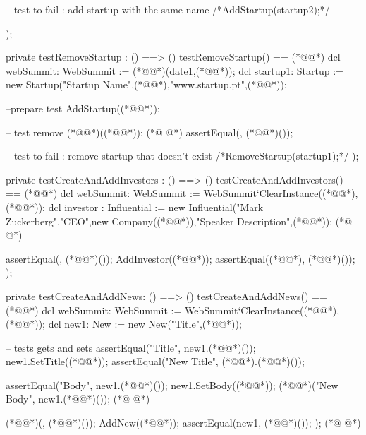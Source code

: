 \begin{vdmpp}[breaklines=true]
  -- test to fail : add startup with the same name
  /*AddStartup(startup2);*/
  
 );
 
 private testRemoveStartup : () ==> ()
 testRemoveStartup() == (*@\vdmnotcovered{(}@*)
  dcl webSummit: WebSummit := (*@@*)(date1,(*@@*));
  dcl startup1: Startup := new Startup("Startup Name",(*@@*),"www.startup.pt",(*@@*));
  
  --prepare test
  AddStartup((*@@*));
  
  -- test remove
  (*@@*)((*@@*));
(*@
\label{testCreateAndAddInvestors:419}
@*)
  assertEqual({}, (*@@*)());
  
  -- test to fail : remove startup that doesn't exist
  /*RemoveStartup(startup1);*/
 );
 
 private testCreateAndAddInvestors : () ==> ()
 testCreateAndAddInvestors() == (*@\vdmnotcovered{(}@*)
  dcl webSummit: WebSummit := WebSummit`ClearInstance((*@@*),(*@@*));
  dcl investor : Influential := new Influential("Mark Zuckerberg","CEO",new Company((*@@*)),"Speaker Description",(*@@*));
(*@
\label{testCreateAndAddNews:429}
@*)

  assertEqual({}, (*@@*)());
  AddInvestor((*@@*));
  assertEqual({(*@@*)}, (*@@*)());
 );
 
 private testCreateAndAddNews: () ==> ()
 testCreateAndAddNews() == (*@\vdmnotcovered{(}@*)
  dcl webSummit: WebSummit := WebSummit`ClearInstance((*@@*),(*@@*));
  dcl new1: New := new New("Title",(*@@*));
  
  -- tests gets and sets
  assertEqual("Title", new1.(*@@*)());
  new1.SetTitle((*@@*));
  assertEqual("New Title", (*@@*).(*@@*)());  
  
  assertEqual("Body", new1.(*@@*)());
  new1.SetBody((*@@*));
  (*@@*)("New Body", new1.(*@@*)()); 
(*@
\label{AddConference:448}
@*)
  
  (*@@*)({}, (*@@*)());
  AddNew((*@@*));
  assertEqual({new1}, (*@@*)());
 );
(*@
\label{AddTalk:453}
@*)
 

\end{vdmpp}
